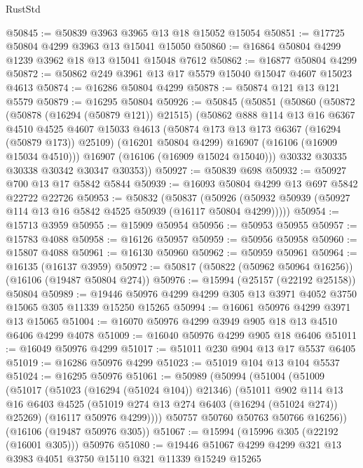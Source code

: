 \begin{lexlean}{RustStd}
\begin{coremodule}
@50845 := @50839 @3963 @3965 @13 @18 @15052 @15054
@50851 := @17725 @50804 @4299 @3963 @13 @15041 @15050
@50860 := @16864 @50804 @4299 @1239 @3962 @18 @13 @15041 @15048 @7612
@50862 := @16877 @50804 @4299
@50872 := @50862 @249 @3961 @13 @17 @5579 @15040 @15047 @4607 @15023 @4613
@50874 := @16286 @50804 @4299
@50878 := @50874 @121 @13 @121 @5579
@50879 := @16295 @50804
@50926 := @50845
    (@50851
      (@50860
        (@50872
          (@50878 (@16294 (@50879 @121)) @21515)
          (@50862
            @888
            @114
            @13
            @16
            @6367
            @4510
            @4525
            @4607
            @15033
            @4613
            (@50874 @173 @13 @173 @6367 (@16294 (@50879 @173)) @25109)
            (@16201 @50804 @4299)
            @16907
            (@16106 (@16909 @15034 @4510)))
          @16907
          (@16106 (@16909 @15024 @15040)))
        @30332
        @30335
        @30338
        @30342
        @30347
        @30353))
@50927 := @50839 @698
@50932 := @50927 @700 @13 @17 @5842 @5844
@50939 := @16093 @50804 @4299 @13 @697 @5842 @22722 @22726
@50953 := @50832
    (@50837 (@50926 (@50932 @50939 (@50927 @114 @13 @16 @5842 @4525 @50939 (@16117 @50804 @4299)))))
@50954 := @15713 @3959
@50955 := @15909 @50954
@50956 := @50953 @50955
@50957 := @15783 @4088
@50958 := @16126 @50957
@50959 := @50956 @50958
@50960 := @15807 @4088
@50961 := @16130 @50960
@50962 := @50959 @50961
@50964 := @16135 (@16137 @3959)
@50972 := @50817 (@50822 (@50962 @50964 @16256)) (@16106 (@19487 @50804 @274))
@50976 := @15994 (@25157 (@22192 @25158)) @50804
@50989 := @19446 @50976 @4299 @4299 @305 @13 @3971 @4052 @3750 @15065 @305 @11339 @15250 @15265
@50994 := @16061 @50976 @4299 @3971 @13 @15065
@51004 := @16070 @50976 @4299 @3949 @905 @18 @13 @4510 @6406 @4299 @4078
@51009 := @16040 @50976 @4299 @905 @18 @6406
@51011 := @16049 @50976 @4299
@51017 := @51011 @230 @904 @13 @17 @5537 @6405
@51019 := @16286 @50976 @4299
@51023 := @51019 @104 @13 @104 @5537
@51024 := @16295 @50976
@51061 := @50989
    (@50994
      (@51004
        (@51009
          (@51017
            (@51023 (@16294 (@51024 @104)) @21346)
            (@51011
              @902
              @114
              @13
              @16
              @6403
              @4525
              (@51019 @274 @13 @274 @6403 (@16294 (@51024 @274)) @25269)
              (@16117 @50976 @4299))))
        @50757
        @50760
        @50763
        @50766
        @16256))
    (@16106 (@19487 @50976 @305))
@51067 := @15994 (@15996 @305 (@22192 (@16001 @305))) @50976
@51080 := @19446 @51067 @4299 @4299 @321 @13 @3983 @4051 @3750 @15110 @321 @11339 @15249 @15265

\end{coremodule}
\end{lexlean}
